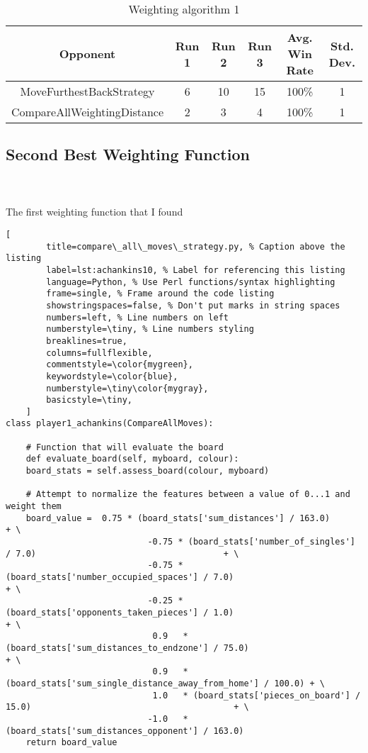 \documentclass[
	12pt, %
]{fphw}
\begin{document}
\begin{table}[H]
	\centering
	\begin{tabular}{||c | c c c c c||}
		\hline
		Opponent & Run 1&   Run 2 & Run 3 & Avg. Win Rate & Std. Dev. \\ [0.5ex]
		\hline\hline
		MoveFurthestBackStrategy &  6 & 10 & 15 & 100\% & 1 \\
		\hline
		CompareAllWeightingDistance & 2 & 3 & 4 & 100\% & 1 \\ [1ex]
		\hline
	\end{tabular}
	\caption{Weighting algorithm 1}
	\label{table:1}
\end{table}

\subsection*{Second Best Weighting Function}

\hfill\\ \\  The first weighting function that I found

\begin{lstlisting}[
		title=compare\_all\_moves\_strategy.py, % Caption above the listing
		label=lst:achankins10, % Label for referencing this listing
		language=Python, % Use Perl functions/syntax highlighting
		frame=single, % Frame around the code listing
		showstringspaces=false, % Don't put marks in string spaces
		numbers=left, % Line numbers on left
		numberstyle=\tiny, % Line numbers styling
		breaklines=true,
		columns=fullflexible,
		commentstyle=\color{mygreen},
		keywordstyle=\color{blue},
		numberstyle=\tiny\color{mygray},
		basicstyle=\tiny,
	]
class player1_achankins(CompareAllMoves):

    # Function that will evaluate the board
    def evaluate_board(self, myboard, colour):
    board_stats = self.assess_board(colour, myboard)

    # Attempt to normalize the features between a value of 0...1 and weight them
    board_value =  0.75 * (board_stats['sum_distances'] / 163.0)                                        + \
                            -0.75 * (board_stats['number_of_singles'] / 7.0)                                     + \
                            -0.75 * (board_stats['number_occupied_spaces'] / 7.0)                          + \
                            -0.25 * (board_stats['opponents_taken_pieces'] / 1.0)                            + \
                             0.9   * (board_stats['sum_distances_to_endzone'] / 75.0)                      + \
                             0.9   * (board_stats['sum_single_distance_away_from_home'] / 100.0) + \
                             1.0   * (board_stats['pieces_on_board'] / 15.0)                                        + \
                            -1.0   * (board_stats['sum_distances_opponent'] / 163.0)
    return board_value

\end{lstlisting}
\end{document}
